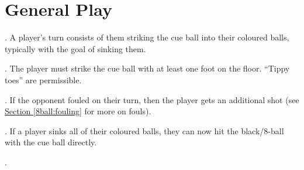 \section{General Play} \label{8ball:general}

\ex. A player's turn consists of them striking the cue ball into their coloured balls, typically with the goal of sinking them.\par
\ex. The player must strike the cue ball with at least one foot on the floor. “Tippy toes” are permissible.\par
\ex. If the opponent fouled on their turn, then the player gets an additional shot (see \hyperref[8ball:fouling]{Section \ref*{8ball:fouling}} for more on fouls).\par
\ex. If a player sinks all of their coloured balls, they can now hit the black/8-ball with the cue ball directly.\par
\ex. \AlternateTurns[8ball]\par


